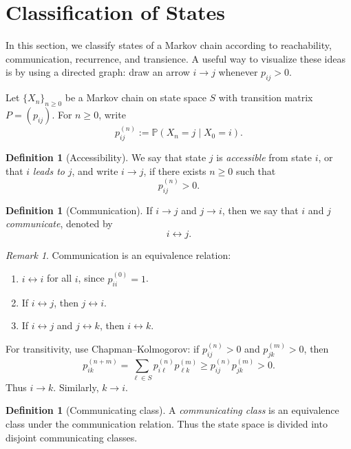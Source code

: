 \documentclass[11pt]{article}
\theoremstyle{plain}
\theoremstyle{definition}
\newtheorem{definition}[theorem]{Definition}
\theoremstyle{remark}
\newtheorem{remark}[theorem]{Remark}
\begin{document}
\section{Classification of States}

In this section, we classify states of a Markov chain according to reachability, communication, recurrence, and transience. A useful way to visualize these ideas is by using a directed graph: draw an arrow \(i\to j\) whenever \(p_{ij}>0\).

Let \(\{X_n\}_{n\ge 0}\) be a Markov chain on state space \(S\) with transition matrix \(P=(p_{ij})\). For \(n\ge 0\), write
\[
p_{ij}^{(n)}:=\mathbb{P}(X_n=j\mid X_0=i).
\]



\begin{definition}[Accessibility]
	We say that state \(j\) is \emph{accessible} from state \(i\), or that \(i\) \emph{leads to} \(j\), and write \(i\to j\), if there exists \(n\ge 0\) such that
	\[
	p_{ij}^{(n)}>0.
	\]
\end{definition}

\begin{definition}[Communication]
	If \(i\to j\) and \(j\to i\), then we say that \(i\) and \(j\) \emph{communicate}, denoted by
	\[
	i\leftrightarrow j.
	\]
\end{definition}

\begin{remark}
	Communication is an equivalence relation:
	\begin{enumerate}[label=\arabic*)]
		\item \(i\leftrightarrow i\) for all \(i\), since \(p_{ii}^{(0)}=1\).
		\item If \(i\leftrightarrow j\), then \(j\leftrightarrow i\).
		\item If \(i\leftrightarrow j\) and \(j\leftrightarrow k\), then \(i\leftrightarrow k\).
	\end{enumerate}
	For transitivity, use Chapman--Kolmogorov: if \(p_{ij}^{(n)}>0\) and \(p_{jk}^{(m)}>0\), then
	\[
	p_{ik}^{(n+m)}
	=
	\sum_{\ell\in S}p_{i\ell}^{(n)}p_{\ell k}^{(m)}
	\ge
	p_{ij}^{(n)}p_{jk}^{(m)}
	>0.
	\]
	Thus \(i\to k\). Similarly, \(k\to i\).
\end{remark}

\begin{definition}[Communicating class]
	A \emph{communicating class} is an equivalence class under the communication relation. Thus the state space is divided into disjoint communicating classes.
\end{definition}
\end{document}
